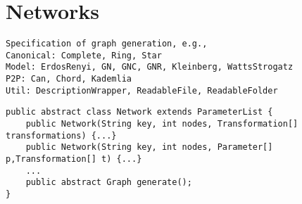 
\section{Networks}
\label{sec:networks}



\begin{verbatim}
Specification of graph generation, e.g.,
Canonical: Complete, Ring, Star
Model: ErdosRenyi, GN, GNC, GNR, Kleinberg, WattsStrogatz
P2P: Can, Chord, Kademlia
Util: DescriptionWrapper, ReadableFile, ReadableFolder
\end{verbatim}



\begin{lstlisting}[label={lst:network},caption={Main components of a network}]
public abstract class Network extends ParameterList {
	public Network(String key, int nodes, Transformation[] transformations) {...}
	public Network(String key, int nodes, Parameter[] p,Transformation[] t) {...}
	...
	public abstract Graph generate();
}
\end{lstlisting}



